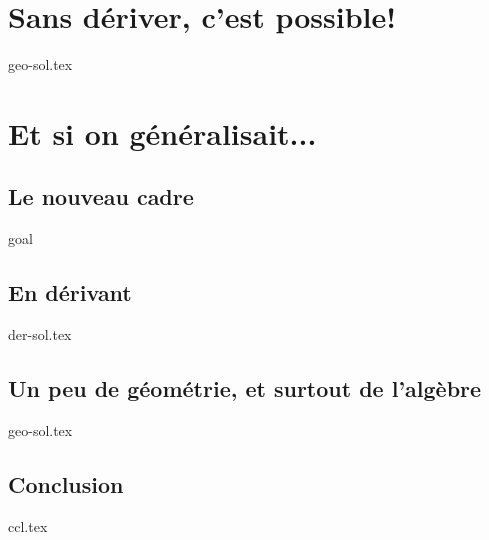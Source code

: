 \documentclass[12pt]{amsart}
\begin{document}
\section{Sans dériver, c'est possible!}

{geo-sol.tex}




\section{Et si on généralisait...}

	\subsection{Le nouveau cadre}
	{goal}
	
	\subsection{En dérivant}
	{der-sol.tex}
	
	\subsection{Un peu de géométrie, et surtout de l'algèbre}
	{geo-sol.tex}


	\subsection{Conclusion}
	{ccl.tex}
\end{document}
